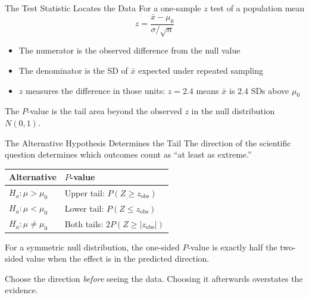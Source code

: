 \documentclass[aspectratio=169]{beamer}
\begin{document}
\begin{frame}{The Test Statistic Locates the Data}
For a one-sample $z$ test of a population mean
$$z=\frac{\bar{x}-\mu_0}{\sigma/\sqrt{n}}$$
\begin{itemize}
  \item The numerator is the observed difference from the null value
  \item The denominator is the SD of $\bar{x}$ expected under repeated sampling
  \item $z$ measures the difference in those units: $z=2.4$ means $\bar{x}$ is $2.4$ SDs above $\mu_0$
\end{itemize}
The $P$-value is the tail area beyond the observed $z$ in the null distribution $N(0,1)$.
\end{frame}

\begin{frame}{The Alternative Hypothesis Determines the Tail}
The direction of the scientific question determines which outcomes count as ``at least as extreme.''
\begin{center}
\begin{tabular}{ll}
\toprule
\textbf{Alternative} & \textbf{$P$-value} \\
\midrule
$H_a:\mu>\mu_0$ & Upper tail: $P(Z\ge z_{\text{obs}})$ \\
$H_a:\mu<\mu_0$ & Lower tail: $P(Z\le z_{\text{obs}})$ \\
$H_a:\mu\ne\mu_0$ & Both tails: $2P(Z\ge |z_{\text{obs}}|)$ \\
\bottomrule
\end{tabular}
\end{center}
For a symmetric null distribution, the one-sided $P$-value is exactly half the two-sided value when the effect is in the predicted direction.

\vspace{0.1cm}
Choose the direction \emph{before} seeing the data. Choosing it afterwards overstates the evidence.
\end{frame}
\end{document}

